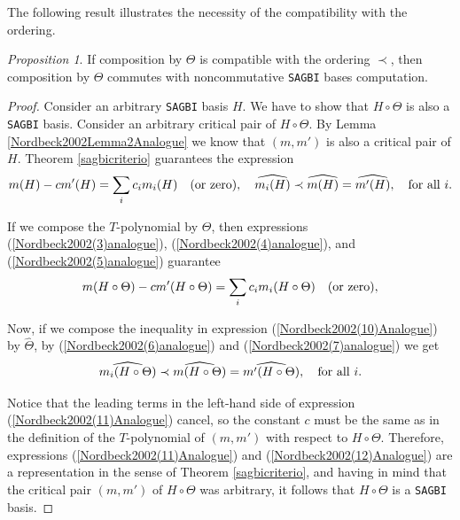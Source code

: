 \documentclass{amsart}
\theoremstyle{definition}
\theoremstyle{remark}
\newtheorem{proposition}[theorem]{Proposition}
\numberwithin{equation}{section}
\begin{document}
The following result illustrates the necessity of the compatibility with the ordering.

\begin{proposition}\label{Nordbeck2002Proposition1Analogue}  
If composition by $\Theta$ is compatible with the ordering $\prec$, then composition by $\Theta$ commutes with noncommutative {\rm \texttt{SAGBI}} bases computation.
\end{proposition}
\begin{proof}
Consider an arbitrary \texttt{SAGBI} basis $H$. We have to show that $H\circ \Theta$ is also a \texttt{SAGBI} basis. Consider an arbitrary critical pair of $H\circ \Theta$. By Lemma \ref{Nordbeck2002Lemma2Analogue} we know that $(m, m')$ is also a critical pair of $H$. Theorem \ref{sagbicriterio} guarantees the expression
\begin{equation}\label{Nordbeck2002(10)Analogue}
    m(H) - cm'(H) = \sum_i c_i m_i(H)\quad {\rm (or\ zero)},\quad \widehat{m_i(H)} \prec \widehat{m(H)} = \widehat{m'(H)},\quad {\rm for\ all}\ i.
\end{equation}

If we compose the $T$-polynomial by $\Theta$, then expressions (\ref{Nordbeck2002(3)analogue}), (\ref{Nordbeck2002(4)analogue}), and (\ref{Nordbeck2002(5)analogue}) guarantee
\begin{equation}\label{Nordbeck2002(11)Analogue}
    m(H\circ \Theta) - cm'(H \circ \Theta) = \sum_i c_im_i(H\circ \Theta)\quad {\rm (or\ zero)},
\end{equation}

Now, if we compose the inequality in expression (\ref{Nordbeck2002(10)Analogue}) by $\widehat{\Theta}$, by (\ref{Nordbeck2002(6)analogue}) and (\ref{Nordbeck2002(7)analogue}) we get
\begin{equation}\label{Nordbeck2002(12)Analogue}
    \widehat{m_i(H\circ \Theta)} \prec \widehat{m(H\circ \Theta)} = \widehat{m'(H\circ \Theta)}, \quad {\rm for\ all}\ i.
\end{equation}

Notice that the leading terms in the left-hand side of expression (\ref{Nordbeck2002(11)Analogue}) cancel, so the constant $c$ must be the same as in the definition of the $T$-polynomial of $(m, m')$ with respect to $H\circ \Theta$. Therefore, expressions (\ref{Nordbeck2002(11)Analogue}) and (\ref{Nordbeck2002(12)Analogue}) are a representation in the sense of Theorem \ref{sagbicriterio}, and having in mind that the critical pair $(m, m')$ of $H\circ \Theta$ was arbitrary, it follows that $H\circ \Theta$ is a \texttt{SAGBI} basis.
\end{proof}
\end{document}
